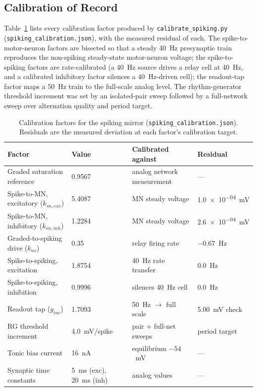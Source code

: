 \subsection{Calibration of Record}

Table~\ref{tab:app_spk_cal} lists every calibration factor produced by \texttt{calibrate\_spiking.py} (\texttt{spiking\_calibration.json}), with the measured residual of each. The spike-to-motor-neuron factors are bisected so that a steady \qty{40}{\hertz} presynaptic train reproduces the non-spiking steady-state motor-neuron voltage; the spike-to-spiking factors are rate-calibrated (a \qty{40}{\hertz} source drives a relay cell at \qty{40}{\hertz}, and a calibrated inhibitory factor silences a \qty{40}{\hertz}-driven cell); the readout-tap factor maps a \qty{50}{\hertz} train to the full-scale analog level. The rhythm-generator threshold increment was set by an isolated-pair sweep followed by a full-network sweep over alternation quality and period target.

\begin{table}[htbp]
\caption{Calibration factors for the spiking mirror (\texttt{spiking\_calibration.json}). Residuals are the measured deviation at each factor's calibration target.}
\label{tab:app_spk_cal}
\begin{tabular}{@{}llll@{}}
\toprule
\textbf{Factor} & \textbf{Value} & \textbf{Calibrated against} & \textbf{Residual} \\
\midrule
Graded saturation reference & 0.9567 & analog network measurement & --- \\
Spike-to-MN, excitatory ($k_{sn,exc}$) & 5.4087 & MN steady voltage & \qty{1.0e-04}{\mV} \\
Spike-to-MN, inhibitory ($k_{sn,inh}$) & 1.2284 & MN steady voltage & \qty{2.6e-04}{\mV} \\
Graded-to-spiking drive ($k_{ns}$) & 0.35 & relay firing rate & $-0.67$~Hz \\
Spike-to-spiking, excitation & 1.8754 & \qty{40}{\hertz} rate transfer & \qty{0.0}{\hertz} \\
Spike-to-spiking, inhibition & 0.9996 & silences \qty{40}{\hertz} cell & \qty{0.0}{\hertz} \\
Readout tap ($g_{inc}$) & 1.7093 & \qty{50}{\hertz} $\to$ full scale & \qty{5.00}{\mV} check \\
RG threshold increment & 4.0~mV/spike & pair + full-net sweeps & period target \\
Tonic bias current & 16~nA & equilibrium $-54$~mV & --- \\
Synaptic time constants & 5~ms (exc), 20~ms (inh) & analog values & --- \\
\bottomrule
\end{tabular}
\end{table}

